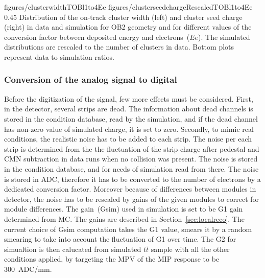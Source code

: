                 {figures/clusterwidthTOBl1to4Ee}
                 {figures/clusterseedchargeRescaledTOBl1to4Ee} %
                 {0.45}       %
                 { Distribution of the on-track cluster width (left) and cluster seed charge (right) in data and simulation for OB2 geometry and for different values of the conversion factor between deposited energy and electrons~($Ee$).  The simulated distributions are rescaled to the number of clusters in data.  Bottom plots represent data to simulation ratios. }


\subsubsection{Conversion of the analog signal to digital~\label{sec:digitize}}

Before the digitization of the signal, few more effects must be considered. First, in the detector, several strips are dead. The information about dead channels is stored in the condition database, read by the simulation, and if the dead channel has non-zero value of simulated charge, it is set to zero. Secondly, to mimic real conditions, the realistic noise has to be added to each strip. The noise per each strip is determined from the the fluctuation of the strip charge after pedestal and CMN subtraction in data runs when no collision was present. The noise is stored in the condition database, and for needs of simulation read from there. The noise is stored in ADC, therefore it has to be converted to the number of electrons by a dedicated conversion factor. Moreover because of differences between modules in detector, the noise has to be rescaled by gains of the given modules to correct for module differences. The gain~(Gsim) used in simulation is set to be G1 gain determined from MC. The gains are described in Section~\ref{sec:localreco}. The current choice of Gsim computation takes the G1 value, smears it by a random smearing to take into account the fluctuation of G1 over time. The G2 for simualtion is then calucated from simulated $t\bar{t}$ sample with all the other conditions applied, by targeting the MPV of the MIP response to be 300~ADC/mm.


